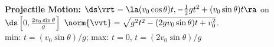 {\textbf{Projectile Motion:}
 $\ds \vrt = \la (v_0\cos \theta)t,-\frac12gt^2+(v_0\sin\theta)t \ra$ on $\ds \left[0,\frac{2v_0\sin\theta}g\right]$
}
{
$\norm{\vvt} = \sqrt{g^2t^2-(2gv_0\sin\theta)t+v_0^2}$. \\
min: $t=(v_0\sin\theta)/g$; max: $t=0$, $t=(2v_0\sin\theta)/g$
}